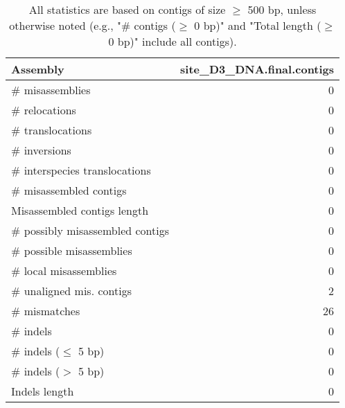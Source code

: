 \documentclass[12pt,a4paper]{article}
\begin{document}
\begin{table}[ht]
\begin{center}
\caption{All statistics are based on contigs of size $\geq$ 500 bp, unless otherwise noted (e.g., "\# contigs ($\geq$ 0 bp)" and "Total length ($\geq$ 0 bp)" include all contigs).}
\begin{tabular}{|l*{1}{|r}|}
\hline
Assembly & site\_D3\_DNA.final.contigs \\ \hline
\# misassemblies & 0 \\ \hline
\hspace{5mm}\# relocations & 0 \\ \hline
\hspace{5mm}\# translocations & 0 \\ \hline
\hspace{5mm}\# inversions & 0 \\ \hline
\hspace{5mm}\# interspecies translocations & 0 \\ \hline
\# misassembled contigs & 0 \\ \hline
Misassembled contigs length & 0 \\ \hline
\# possibly misassembled contigs & 0 \\ \hline
\hspace{5mm}\# possible misassemblies & 0 \\ \hline
\# local misassemblies & 0 \\ \hline
\# unaligned mis. contigs & 2 \\ \hline
\# mismatches & 26 \\ \hline
\# indels & 0 \\ \hline
\hspace{5mm}\# indels ($\leq$ 5 bp) & 0 \\ \hline
\hspace{5mm}\# indels ($>$ 5 bp) & 0 \\ \hline
Indels length & 0 \\ \hline
\end{tabular}
\end{center}
\end{table}
\end{document}
